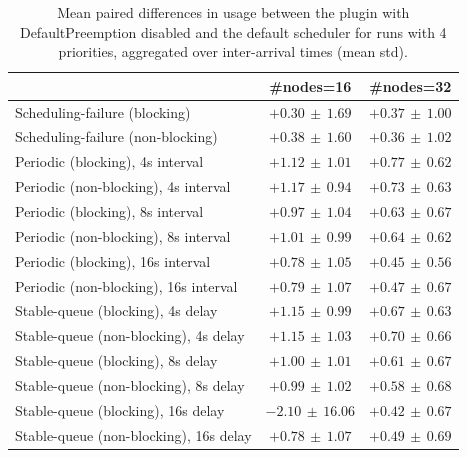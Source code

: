 \begin{table}[t]
\tiny
\setlength{\tabcolsep}{1.2pt}
\renewcommand{\arraystretch}{1.12}
\centering
\caption{Mean paired differences in usage between the plugin with DefaultPreemption disabled and the default scheduler for runs with 4 priorities, aggregated over inter-arrival times (mean \pm std).}
\label{tab:usage-defpreempt0-prio4-std1-agg-arrival}
\begin{tabular}{l c c}
\toprule
 & \#nodes=16 & \#nodes=32 \\
\midrule
Scheduling-failure (blocking) & $+0.30\,\pm\,1.69$ & $+0.37\,\pm\,1.00$ \\
Scheduling-failure (non-blocking) & $+0.38\,\pm\,1.60$ & $+0.36\,\pm\,1.02$ \\
Periodic (blocking), 4s interval & $+1.12\,\pm\,1.01$ & $+0.77\,\pm\,0.62$ \\
Periodic (non-blocking), 4s interval & $+1.17\,\pm\,0.94$ & $+0.73\,\pm\,0.63$ \\
Periodic (blocking), 8s interval & $+0.97\,\pm\,1.04$ & $+0.63\,\pm\,0.67$ \\
Periodic (non-blocking), 8s interval & $+1.01\,\pm\,0.99$ & $+0.64\,\pm\,0.62$ \\
Periodic (blocking), 16s interval & $+0.78\,\pm\,1.05$ & $+0.45\,\pm\,0.56$ \\
Periodic (non-blocking), 16s interval & $+0.79\,\pm\,1.07$ & $+0.47\,\pm\,0.67$ \\
Stable-queue (blocking), 4s delay & $+1.15\,\pm\,0.99$ & $+0.67\,\pm\,0.63$ \\
Stable-queue (non-blocking), 4s delay & $+1.15\,\pm\,1.03$ & $+0.70\,\pm\,0.66$ \\
Stable-queue (blocking), 8s delay & $+1.00\,\pm\,1.01$ & $+0.61\,\pm\,0.67$ \\
Stable-queue (non-blocking), 8s delay & $+0.99\,\pm\,1.02$ & $+0.58\,\pm\,0.68$ \\
Stable-queue (blocking), 16s delay & $-2.10\,\pm\,16.06$ & $+0.42\,\pm\,0.67$ \\
Stable-queue (non-blocking), 16s delay & $+0.78\,\pm\,1.07$ & $+0.49\,\pm\,0.69$ \\
\bottomrule
\end{tabular}
\end{table}
